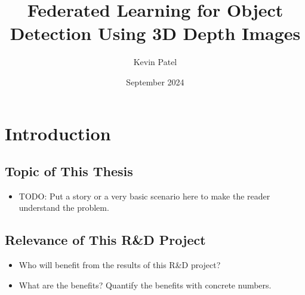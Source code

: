 \documentclass[thesis]{mas_proposal}
\title{Federated Learning for Object Detection Using 3D Depth Images}
\author{Kevin Patel}
\date{September 2024}
\begin{document}
\maketitle

\pagestyle{plain}

\section{Introduction}

\subsection{Topic of This Thesis}
\begin{itemize}

    \item TODO: Put a story or a very basic scenario here to make the reader understand the problem.


\end{itemize}

\subsection{Relevance of This R\&D Project}
\begin{itemize}
    
      \item Who will benefit from the results of this R\&D project?
      \item What are the benefits? Quantify the benefits with concrete numbers.
\end{itemize}
\end{document}
